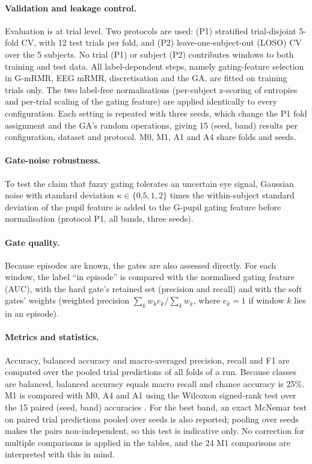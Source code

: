 \documentclass[11pt,a4paper]{article}
\begin{document}
\paragraph{Validation and leakage control.} Evaluation is at trial level. Two protocols are used: (P1) stratified trial-disjoint 5-fold CV, with 12 test trials per fold, and (P2) leave-one-subject-out (LOSO) CV over the 5 subjects. No trial (P1) or subject (P2) contributes windows to both training and test data. All label-dependent steps, namely gating-feature selection in G-mRMR, EEG mRMR, discretisation and the GA, are fitted on training trials only. The two label-free normalisations (per-subject z-scoring of entropies and per-trial scaling of the gating feature) are applied identically to every configuration. Each setting is repeated with three seeds, which change the P1 fold assignment and the GA's random operations, giving 15 (seed, band) results per configuration, dataset and protocol. M0, M1, A1 and A4 share folds and seeds.

\paragraph{Gate-noise robustness.} To test the claim that fuzzy gating tolerates an uncertain eye signal, Gaussian noise with standard deviation $\kappa\in\{0.5,1,2\}$ times the within-subject standard deviation of the pupil feature is added to the G-pupil gating feature before normalisation (protocol P1, all bands, three seeds).

\paragraph{Gate quality.} Because episodes are known, the gates are also assessed directly. For each window, the label ``in episode'' is compared with the normalised gating feature (AUC), with the hard gate's retained set (precision and recall) and with the soft gates' weights (weighted precision $\sum_k w_k e_k/\sum_k w_k$, where $e_k=1$ if window $k$ lies in an episode).

\paragraph{Metrics and statistics.} Accuracy, balanced accuracy and macro-averaged precision, recall and F1 are computed over the pooled trial predictions of all folds of a run. Because classes are balanced, balanced accuracy equals macro recall and chance accuracy is 25\%. M1 is compared with M0, A4 and A1 using the Wilcoxon signed-rank test over the 15 paired (seed, band) accuracies \cite{Demsar2006}. For the best band, an exact McNemar test \cite{McNemar1947} on paired trial predictions pooled over seeds is also reported; pooling over seeds makes the pairs non-independent, so this test is indicative only. No correction for multiple comparisons is applied in the tables, and the 24 M1 comparisons are interpreted with this in mind.
\end{document}
